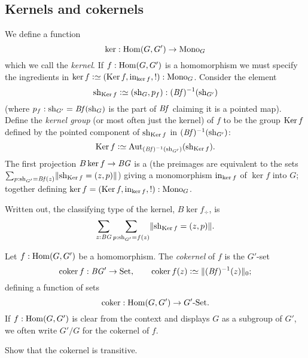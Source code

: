 \subsection{Kernels and cokernels}
\label{sec:kerandcoker}
\begin{definition}
  \label{def:kernel}
 We define a function
  $$\ker:\Hom(G,G')\to\typemono_G$$
  which we call the \emph{kernel}.
 If $f:\Hom(G,G')$  is a homomorphism we must specify the ingredients in  $\ker f\defequi(\Ker f,\incl_{\ker f},!):\typemono_G$.    Consider the element
$$\sh_{\Ker f}\defequi(\sh_G,p_f):(\Bf)^{-1}(\sh_{G'})$$ (where $p_f:\mathrm{sh}_{G'}=\mathit{B}\mathit{f}(\mathrm{sh}_G)$ is the part of $\mathit{B}\mathit{f}$ claiming it is a pointed map).
Define the \emph{kernel group} (or most often just the kernel)
of $f$ to be the group $\Ker f$ defined by the pointed component  of $\sh_{\Ker f}$ in $(\mathit{B}\mathit{f})^{-1}(\mathrm{sh}_{G'})$:
$$\Ker f\defequi \aut_{(\Bf)^{-1}(\sh_{G'})}(\sh_{\Ker f}).
$$
The first projection $B\ker f\to \BG$ is a \covering (the preimages are equivalent to the sets $\sum_{p:\sh_{G'}=\Bf(z)}\Trunc{\sh_{\Ker f}=(z,p)}$) giving a monomorphism
$\incl_{\ker f}$ of $\ker f$ into $G$; together defining $\ker f=(\Ker f,\incl_{\ker f},!):\typemono_G$.
\end{definition}

Written out, the classifying type of the kernel,
$B\ker f_\div$, is $$\sum_{z:\BG}\sum_{p:\sh_{G'}=f(z)}\Trunc{\sh_{\Ker f}=(z,p)}.$$

\begin{definition}
  \label{def:cokernel}
  Let $f:\Hom(G,G')$  be a homomorphism.
The \emph{cokernel} of $f$ is the $G'$-set
\[
  \coker f:\BG'\to\Set,\qquad \coker f(z)\defequi  \Trunc{(\Bf)^{-1}(z)}_0;
\]
defining a function of sets
$$\coker:\Hom(G,G')\to G'\text{-}\Set.$$
If $f:\Hom(G,G')$ is clear from the context and displays $G$ as a subgroup of $G'$, we often write $G'/G$ for the cokernel of $f$.
\end{definition}
\begin{xca}
  Show that the cokernel is transitive.
\end{xca}

